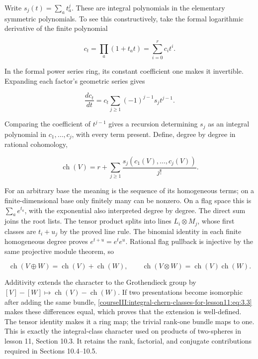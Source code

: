 \label{courseIII:integral-chern-classes-for-lesson11:section-3}\label{courseIII:integral-chern-classes-for-lesson11:CG-S6-CHERN-3}

Write \(s_j(t)=\sum_a t_a^j\). These are integral polynomials in the elementary symmetric polynomials. To see this constructively, take the formal logarithmic derivative of the finite polynomial

\[
c_t=\prod_a(1+t_at)=\sum_{i=0}^r c_i t^i.
\]

In the formal power series ring, its constant coefficient one makes it invertible. Expanding each factor's geometric series gives

\begin{equation}
\frac{d c_t}{dt}=c_t\sum_{j\ge1}(-1)^{j-1}s_jt^{j-1}.
\label{courseIII:integral-chern-classes-for-lesson11:eq:3.1}
\end{equation}

Comparing the coefficient of \(t^{j-1}\) gives a recursion determining \(s_j\) as an integral polynomial in \(c_1,\ldots,c_j\), with every term present. Define, degree by degree in rational cohomology,

\begin{equation}
\operatorname{ch}(V)=r+\sum_{j\ge1}\frac{s_j(c_1(V),\ldots,c_j(V))}{j!}.
\label{courseIII:integral-chern-classes-for-lesson11:eq:3.2}
\end{equation}

For an arbitrary base the meaning is the sequence of its homogeneous terms; on a finite-dimensional base only finitely many can be nonzero. On a flag space this is \(\sum_a e^{t_a}\), with the exponential also interpreted degree by degree. The direct sum joins the root lists. The tensor product splits into lines \(L_i\otimes M_j\), whose first classes are \(t_i+u_j\) by the proved line rule. The binomial identity in each finite homogeneous degree proves \(e^{t+u}=e^te^u\). Rational flag pullback is injective by the same projective module theorem, so

\begin{equation}
\operatorname{ch}(V\oplus W)=\operatorname{ch}(V)+\operatorname{ch}(W),\qquad
\operatorname{ch}(V\otimes W)=\operatorname{ch}(V)\operatorname{ch}(W).
\label{courseIII:integral-chern-classes-for-lesson11:eq:3.3}
\end{equation}

Additivity extends the character to the Grothendieck group by \([V]-[W]\mapsto\operatorname{ch}(V)-\operatorname{ch}(W)\). If two presentations become isomorphic after adding the same bundle, \eqref{courseIII:integral-chern-classes-for-lesson11:eq:3.3} makes these differences equal, which proves that the extension is well-defined. The tensor identity makes it a ring map; the trivial rank-one bundle maps to one. This is exactly the integral-class character used on products of two-spheres in lesson 11, Section 10.3. It retains the rank, factorial, and conjugate contributions required in Sections 10.4--10.5.
